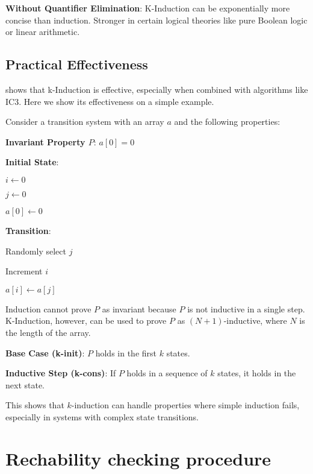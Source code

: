 \noindent    \textbf{Without Quantifier Elimination}:
        K-Induction can be exponentially more concise than induction. Stronger in certain logical theories like pure Boolean logic or linear arithmetic.

\subsection*{Practical Effectiveness}
\noindent \cite{7886665} shows that k-Induction is effective, especially when combined with algorithms like IC3.
Here we show its effectiveness on a simple example.

\vspace{\baselineskip}\noindent Consider a transition system with an array \( a \) and the following properties:


\vspace{\baselineskip}\noindent \textbf{Invariant Property \( P \)}: \( a[0] = 0 \)

\noindent \textbf{Initial State}:

\( i \gets 0 \)

\( j \gets 0 \)

\( a[0] \gets 0 \)

\newpage
\vspace{\baselineskip}\noindent \textbf{Transition}:

Randomly select \( j \)

Increment \( i \)

\( a[i] \gets a[j] \)

\vspace{\baselineskip}Induction cannot prove \( P \) as invariant because \( P \) is not inductive in a single step. K-Induction, however, can be used to prove \( P \) as \( (N+1) \)-inductive, where \( N \) is the length of the array.

\vspace{\baselineskip}\noindent \textbf{Base Case (k-init)}: \( P \) holds in the first \( k \) states.

\noindent \textbf{Inductive Step (k-cons)}: If \( P \) holds in a sequence of \( k \) states, it holds in the next state.

\vspace{\baselineskip}This shows that \( k \)-induction can handle properties where simple induction fails, especially in systems with complex state transitions.

\section{Rechability checking procedure}

